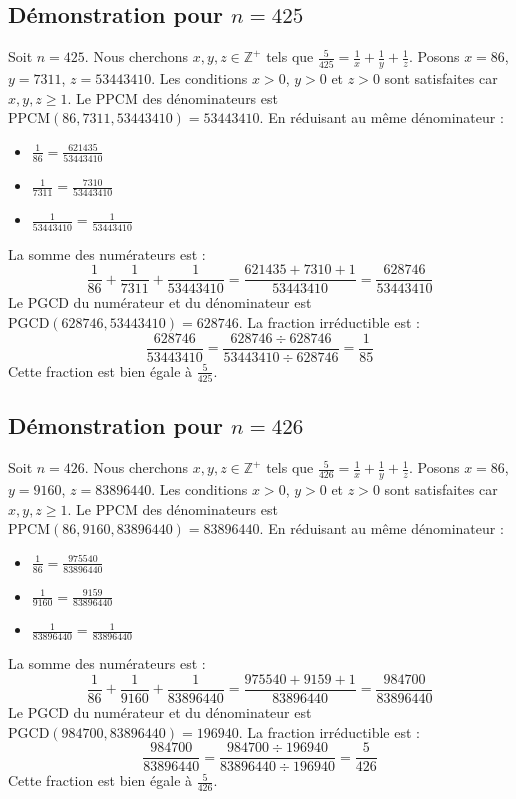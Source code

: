 \documentclass[11pt,a4paper]{article}
\begin{document}
\subsection{Démonstration pour $n = 425$}
Soit $n = 425$. Nous cherchons $x, y, z \in \mathbb{Z}^{+}$ tels que $\frac{5}{425} = \frac{1}{x} + \frac{1}{y} + \frac{1}{z}$.
Posons $x = 86$, $y = 7311$, $z = 53443410$.
Les conditions $x > 0$, $y > 0$ et $z > 0$ sont satisfaites car $x, y, z \geq 1$.
Le PPCM des dénominateurs est $\text{PPCM}(86, 7311, 53443410) = 53443410$.
En réduisant au même dénominateur :
\begin{itemize}
    \item $\frac{1}{86} = \frac{621435}{53443410}$
    \item $\frac{1}{7311} = \frac{7310}{53443410}$
    \item $\frac{1}{53443410} = \frac{1}{53443410}$
\end{itemize}
La somme des numérateurs est :
$$ \frac{1}{86} + \frac{1}{7311} + \frac{1}{53443410} = \frac{621435 + 7310 + 1}{53443410} = \frac{628746}{53443410} $$
Le PGCD du numérateur et du dénominateur est $\text{PGCD}(628746, 53443410) = 628746$.
La fraction irréductible est :
$$ \frac{628746}{53443410} = \frac{628746 \div 628746}{53443410 \div 628746} = \frac{1}{85} $$
Cette fraction est bien égale à $\frac{5}{425}$.

\subsection{Démonstration pour $n = 426$}
Soit $n = 426$. Nous cherchons $x, y, z \in \mathbb{Z}^{+}$ tels que $\frac{5}{426} = \frac{1}{x} + \frac{1}{y} + \frac{1}{z}$.
Posons $x = 86$, $y = 9160$, $z = 83896440$.
Les conditions $x > 0$, $y > 0$ et $z > 0$ sont satisfaites car $x, y, z \geq 1$.
Le PPCM des dénominateurs est $\text{PPCM}(86, 9160, 83896440) = 83896440$.
En réduisant au même dénominateur :
\begin{itemize}
    \item $\frac{1}{86} = \frac{975540}{83896440}$
    \item $\frac{1}{9160} = \frac{9159}{83896440}$
    \item $\frac{1}{83896440} = \frac{1}{83896440}$
\end{itemize}
La somme des numérateurs est :
$$ \frac{1}{86} + \frac{1}{9160} + \frac{1}{83896440} = \frac{975540 + 9159 + 1}{83896440} = \frac{984700}{83896440} $$
Le PGCD du numérateur et du dénominateur est $\text{PGCD}(984700, 83896440) = 196940$.
La fraction irréductible est :
$$ \frac{984700}{83896440} = \frac{984700 \div 196940}{83896440 \div 196940} = \frac{5}{426} $$
Cette fraction est bien égale à $\frac{5}{426}$.
\end{document}
